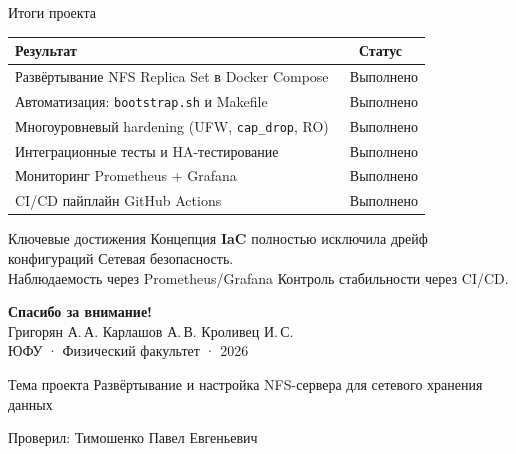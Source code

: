 \documentclass[aspectratio=169,14pt]{beamer}
\begin{document}
	\begin{frame}{Итоги проекта}
		\begin{center}
			\small
			\begin{tabular}{lc}
				\toprule
				\textbf{Результат} & \textbf{Статус} \\
				\midrule
				Развёртывание NFS Replica Set в Docker Compose & \textcolor{accent!70!black}{\checkmark\ Выполнено} \\
				Автоматизация: \texttt{bootstrap.sh} и Makefile & \textcolor{accent!70!black}{\checkmark\ Выполнено} \\
				Многоуровневый hardening (UFW, \texttt{cap\_drop}, RO) & \textcolor{accent!70!black}{\checkmark\ Выполнено} \\
				Интеграционные тесты и HA-тестирование & \textcolor{accent!70!black}{\checkmark\ Выполнено} \\
				Мониторинг Prometheus + Grafana & \textcolor{accent!70!black}{\checkmark\ Выполнено} \\
				CI/CD пайплайн GitHub Actions & \textcolor{accent!70!black}{\checkmark\ Выполнено} \\
				\bottomrule
			\end{tabular}
		\end{center}
		\vspace{-0.2em}
		\begin{block}{\centering Ключевые достижения}
			\centering\footnotesize
			Концепция \textbf{IaC} полностью исключила дрейф конфигураций \quad\textbullet\quad Сетевая безопасность.\\
			Наблюдаемость через Prometheus/Grafana \quad\textbullet\quad Контроль стабильности через CI/CD.
		\end{block}
	\end{frame}
	
	\begin{frame}
		\begin{center}
			\vspace{0.5em}
			{\Large\bfseries\color{primary} Спасибо за внимание!}\\[1.0em]
			{\normalsize Григорян А.\,А. \quad Карлашов А.\,В. \quad Кроливец И.\,С.}\\[0.3em]
			{\small ЮФУ · Физический факультет · 2026}\\[0.8em]
			\begin{block}{\centering Тема проекта}
				\centering\small
				Развёртывание и настройка NFS-сервера для сетевого хранения данных
			\end{block}
			\vspace{0.3em}
			{\footnotesize Проверил: Тимошенко Павел Евгеньевич}
		\end{center}
	\end{frame}
	
\end{document}
